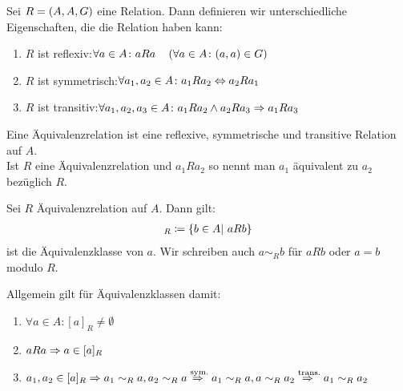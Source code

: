 \begin{definition}[Äquivalenzrelation]
    Sei $R=\left(A, A, G\right)$ eine Relation. Dann definieren wir unterschiedliche Eigenschaften, die die Relation haben kann:
    \begin{enumerate}[label=(\roman*)]
        \item $R$ ist reflexiv:\quad $\forall a\in A\colon aRa\quad\left(\forall a \in A\colon (a,a) \in G\right)$
        \item $R$ ist symmetrisch:\quad $\forall a_1, a_2\in A\colon a_{1}Ra_2\Leftrightarrow{} a_{2}Ra_1$
        \item $R$ ist transitiv:\quad $\forall a_1, a_2, a_3 \in A\colon a_{1}Ra_{2} \land a_{2}Ra_{3} \Rightarrow{} a_{1}Ra_{3}$
    \end{enumerate}
    Eine Äquivalenzrelation ist eine reflexive, symmetrische und transitive Relation auf $A$.\\
    Ist $R$ eine Äquivalenzrelation und $a_{1}Ra_{2}$ so nennt man $a_{1}$ äquivalent zu $a_{2}$ bezüglich $R$.
\end{definition}

\begin{notation}[Äquivalenzklassen]
    Sei $R$ Äquivalenzrelation auf $A$. Dann gilt:
    \begin{align*}
    [a]
        _{R} \definedas \set{b\in A|~aRb}
    \end{align*} ist die Äquivalenzklasse von $a$. Wir schreiben auch $a\sim_R b$ für $aRb$ oder $a = b$ modulo $R$.
\end{notation}

\begin{beobachtung}
    Allgemein gilt für Äquivalenzklassen damit:
    \theoremescape
    \begin{enumerate}[label=(\roman*)]
        \item $\forall a\in A\colon [a]_R \neq \emptyset$
        \item $aRa \Rightarrow{} a\in [a]_R$
        \item $a_1, a_2\in [a]_R \Rightarrow{} a_1 \sim_R a, a_2 \sim_R a \overset{\text{sym.}}{\Rightarrow{}} a_1 \sim_R a, a \sim_R a_2 \overset{\text{trans.}}{\Rightarrow{}} a_1\sim_R a_2$
    \end{enumerate}
\end{beobachtung}


